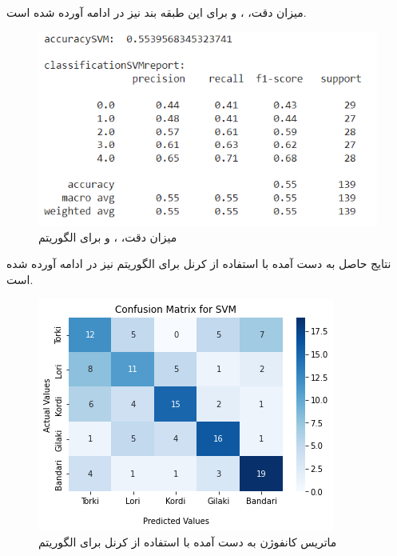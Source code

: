 میزان دقت، ،  و  برای این طبقه بند نیز در ادامه آورده شده است.

\begin{figure}[h!]
	\centering
	\includegraphics[width=0.9\linewidth]{images/svm_scores.PNG}
	\caption{میزان دقت، ،  و  برای الگوریتم }
	\label{fig:svm_scores}
\end{figure}

نتایج حاصل به دست آمده با استفاده از کرنل  برای الگوریتم  نیز در ادامه آورده شده است.

\newpage

\begin{figure}[h!]
	\centering
	\includegraphics[width=0.75\linewidth]{images/svm_rbf_confusion_matrix.png}
	\caption{ماتریس کانفوژن به دست آمده با استفاده از کرنل  برای الگوریتم }
	\label{fig:svm_rbf_confusion_matrix}
\end{figure}

